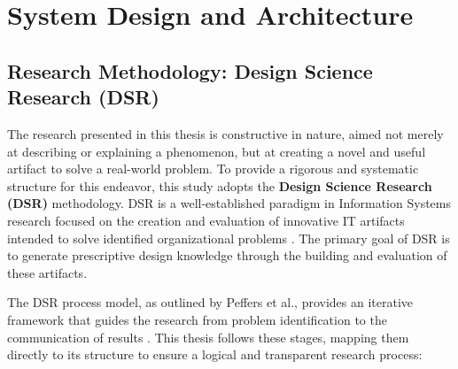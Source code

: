 \chapter{System Design and Architecture}
\label{chap:system_design}


\section{Research Methodology: Design Science Research (DSR)}
\label{sec:dsr_methodology}

The research presented in this thesis is constructive in nature, aimed not merely at describing or explaining a phenomenon, but at creating a novel and useful artifact to solve a real-world problem. To provide a rigorous and systematic structure for this endeavor, this study adopts the \textbf{Design Science Research (DSR)} methodology. DSR is a well-established paradigm in Information Systems research focused on the creation and evaluation of innovative IT artifacts intended to solve identified organizational problems \cite{dsr_methodology_hevner_2004}. The primary goal of DSR is to generate prescriptive design knowledge through the building and evaluation of these artifacts.

The DSR process model, as outlined by Peffers et al., provides an iterative framework that guides the research from problem identification to the communication of results \cite{dsr_methodology_peers_2006}. This thesis follows these stages, mapping them directly to its structure to ensure a logical and transparent research process:

